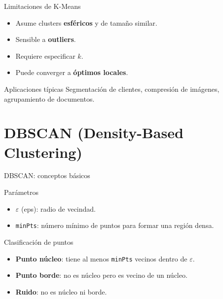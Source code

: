 \documentclass[aspectratio=169, 10pt, xcolor=table]{beamer}
\begin{document}
\begin{frame}{Limitaciones de K-Means}
    \begin{itemize}
        \item Asume clusters \textbf{esféricos} y de tamaño similar.
        \item Sensible a \textbf{outliers}.
        \item Requiere especificar $k$.
        \item Puede converger a \textbf{óptimos locales}.
    \end{itemize}
    \vspace{0.3cm}
    \begin{exampleblock}{Aplicaciones típicas}
        Segmentación de clientes, compresión de imágenes, agrupamiento de documentos.
    \end{exampleblock}
\end{frame}

\section{DBSCAN (Density-Based Clustering)}

\begin{frame}{DBSCAN: conceptos básicos}
    \begin{block}{Parámetros}
        \begin{itemize}
            \item $\varepsilon$ (eps): radio de vecindad.
            \item \texttt{minPts}: número mínimo de puntos para formar una región densa.
        \end{itemize}
    \end{block}
    \begin{block}{Clasificación de puntos}
        \begin{itemize}
            \item \textbf{Punto núcleo}: tiene al menos \texttt{minPts} vecinos dentro de $\varepsilon$.
            \item \textbf{Punto borde}: no es núcleo pero es vecino de un núcleo.
            \item \textbf{Ruido}: no es núcleo ni borde.
        \end{itemize}
    \end{block}
\end{frame}
\end{document}
